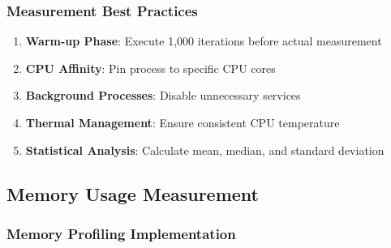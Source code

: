 \documentclass[12pt,a4paper]{article}
\begin{document}
\subsubsection{Measurement Best Practices}

\begin{enumerate}
    \item \textbf{Warm-up Phase}: Execute 1,000 iterations before actual measurement
    \item \textbf{CPU Affinity}: Pin process to specific CPU cores
    \item \textbf{Background Processes}: Disable unnecessary services
    \item \textbf{Thermal Management}: Ensure consistent CPU temperature
    \item \textbf{Statistical Analysis}: Calculate mean, median, and standard deviation
\end{enumerate}

\subsection{Memory Usage Measurement}

\subsubsection{Memory Profiling Implementation}
\end{document}
